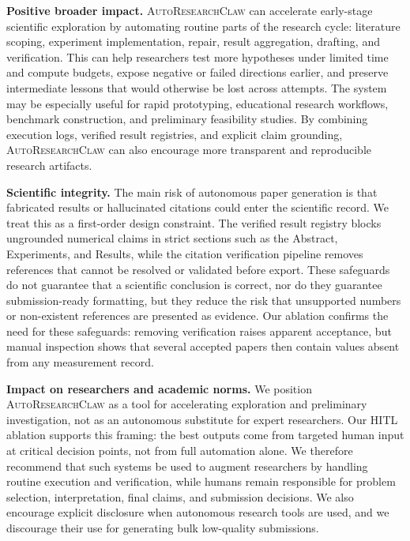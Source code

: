 \documentclass{llmxive}
\providecommand{\system}{\textsc{AutoResearchClaw}}
\begin{document}
\noindent \textbf{Positive broader impact.}
\system{} can accelerate early-stage scientific exploration by automating routine parts of the research cycle: literature scoping, experiment implementation, repair, result aggregation, drafting, and verification. This can help researchers test more hypotheses under limited time and compute budgets, expose negative or failed directions earlier, and preserve intermediate lessons that would otherwise be lost across attempts. The system may be especially useful for rapid prototyping, educational research workflows, benchmark construction, and preliminary feasibility studies. By combining execution logs, verified result registries, and explicit claim grounding, \system{} can also encourage more transparent and reproducible research artifacts.

\noindent \textbf{Scientific integrity.}
The main risk of autonomous paper generation is that fabricated results or hallucinated citations could enter the scientific record. We treat this as a first-order design constraint. The verified result registry blocks ungrounded numerical claims in strict sections such as the Abstract, Experiments, and Results, while the citation verification pipeline removes references that cannot be resolved or validated before export. These safeguards do not guarantee that a scientific conclusion is correct, nor do they guarantee submission-ready formatting, but they reduce the risk that unsupported numbers or non-existent references are presented as evidence. Our ablation confirms the need for these safeguards: removing verification raises apparent acceptance, but manual inspection shows that several accepted papers then contain values absent from any measurement record.

\noindent \textbf{Impact on researchers and academic norms.}
We position \system{} as a tool for accelerating exploration and preliminary investigation, not as an autonomous substitute for expert researchers. Our HITL ablation supports this framing: the best outputs come from targeted human input at critical decision points, not from full automation alone. We therefore recommend that such systems be used to augment researchers by handling routine execution and verification, while humans remain responsible for problem selection, interpretation, final claims, and submission decisions. We also encourage explicit disclosure when autonomous research tools are used, and we discourage their use for generating bulk low-quality submissions.
\end{document}
